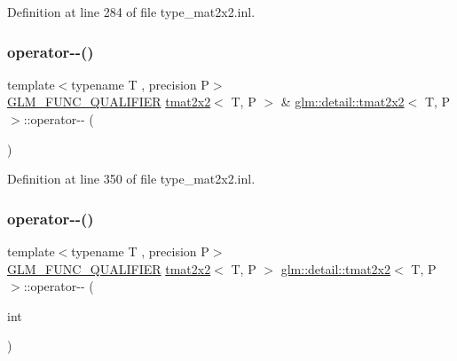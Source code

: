 Definition at line 284 of file type\+\_\+mat2x2.\+inl.

\mbox{\label{structglm_1_1detail_1_1tmat2x2_a06b4e73ada53476205e52ce060506c90}} 
\subsubsection{\texorpdfstring{operator-\/-\/()}{operator--()}\hspace{0.1cm}{\footnotesize\ttfamily [1/2]}}
{\footnotesize\ttfamily template$<$typename T , precision P$>$ \\
\hyperlink{setup_8hpp_a33fdea6f91c5f834105f7415e2a64407}{G\+L\+M\+\_\+\+F\+U\+N\+C\+\_\+\+Q\+U\+A\+L\+I\+F\+I\+ER} \hyperlink{structglm_1_1detail_1_1tmat2x2}{tmat2x2}$<$ T, P $>$ \& \hyperlink{structglm_1_1detail_1_1tmat2x2}{glm\+::detail\+::tmat2x2}$<$ T, P $>$\+::operator-\/-\/ (\begin{DoxyParamCaption}{ }\end{DoxyParamCaption})}



Definition at line 350 of file type\+\_\+mat2x2.\+inl.

\mbox{\label{structglm_1_1detail_1_1tmat2x2_a72d5fa6f7e0f9745d8615781a0f18d58}} 
\subsubsection{\texorpdfstring{operator-\/-\/()}{operator--()}\hspace{0.1cm}{\footnotesize\ttfamily [2/2]}}
{\footnotesize\ttfamily template$<$typename T , precision P$>$ \\
\hyperlink{setup_8hpp_a33fdea6f91c5f834105f7415e2a64407}{G\+L\+M\+\_\+\+F\+U\+N\+C\+\_\+\+Q\+U\+A\+L\+I\+F\+I\+ER} \hyperlink{structglm_1_1detail_1_1tmat2x2}{tmat2x2}$<$ T, P $>$ \hyperlink{structglm_1_1detail_1_1tmat2x2}{glm\+::detail\+::tmat2x2}$<$ T, P $>$\+::operator-\/-\/ (\begin{DoxyParamCaption}\item[{int}]{ }\end{DoxyParamCaption})}



